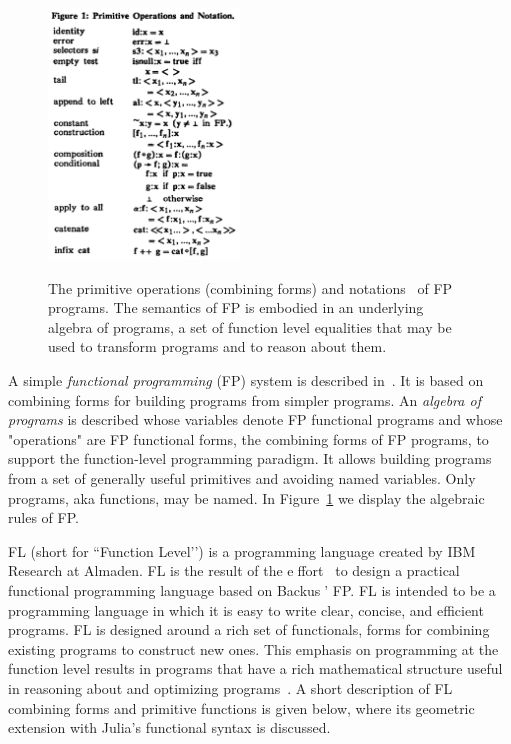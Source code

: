 \begin{figure}
\centering
   \includegraphics[width=2in]{chapter-01/figs/FP.pdf} \hfill~
\caption{The primitive operations (combining forms) and notations~\cite{10.1145/73560.73575} of FP programs. The semantics of FP is embodied in an underlying algebra of programs, a set of function level equalities that may be used to transform programs and to reason about them.}
\label{fig:1:FP}
\end{figure}


A simple \emph{functional programming} (FP) system is described in~\cite{10.1145/359576.359579}. It is based on combining forms for building programs from simpler programs. An \emph{algebra of programs} is described whose variables denote FP functional programs and whose "operations" are FP functional forms, the combining forms of FP programs, to support the function-level programming paradigm. It allows building programs from a set of generally useful primitives and avoiding named variables. Only programs, aka functions, may be named. In Figure~\ref{fig:1:FP} we display the algebraic rules of FP.

FL (short for ``Function Level’’) is a programming language created by IBM Research at Almaden.
FL is the result of the effort~\cite{BWW90} to design a practical functional programming language based on Backus’ FP.  
FL is intended to be a programming language in which it is easy to write clear, concise,
and efficient programs. FL is designed around a rich set of functionals, forms for combining
existing programs to construct new ones. This emphasis on programming at the function
level results in programs that have a rich mathematical structure useful in reasoning about
and optimizing programs~\cite{IBM:RJ7100}.
A short description of FL combining forms  and primitive functions is given below, where its geometric extension with Julia’s functional syntax is discussed.


